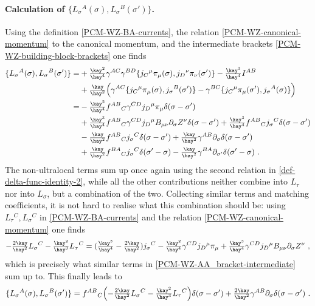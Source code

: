 \documentclass[12pt]{article}
\numberwithin{equation}{section}
\begin{document}
\paragraph{Calculation of $\{L_{\sigma}{}^{A}(\sigma),L_{\sigma}{}^{B}(\sigma')\}$.}  Using the definition \eqref{PCM-WZ-BA-currents}, the relation \eqref{PCM-WZ-canonical-momentum} to the canonical momentum, and the intermediate brackets \eqref{PCM-WZ-building-block-brackets} one finds
\begin{align}\label{PCM-WZ-AA_bracket-intermediate}
\{L_{\sigma}{}^{A}(\sigma),L_{\sigma}{}^{B}(\sigma')\}=&+\tfrac{\kay^2}{\hay^4}\gamma^{AC}\gamma^{BD}\{j_{C}{}^{\mu}\pi_{\mu}(\sigma),j_{D}{}^{\nu}\pi_{\nu}(\sigma')\}-\tfrac{\kay^3}{\hay^4}I^{AB}
\notag \\
&+\tfrac{\kay}{\hay^2}\Bigl( \gamma^{AC}\{j_{C}{}^{\mu}\pi_{\mu}(\sigma),j_{\sigma}{}^{B}(\sigma')\}-\gamma^{BC}\{j_{C}{}^{\mu}\pi_{\mu}(\sigma'),j_{\sigma}{}^{A}(\sigma)\}\Bigr)
\notag \\
=&-\tfrac{\kay^2}{\hay^4}f^{AB}{}_{C}\gamma^{CD}j_{D}{}^{\mu}\pi_{\mu}\delta(\sigma-\sigma')
\notag\\
&+\tfrac{\kay^3}{\hay^4}f^{AB}{}_{C}\gamma^{CD}j_{D}{}^{\mu}B_{\mu\nu}\partial_{\sigma}Z^{\nu}\delta(\sigma-\sigma')+\tfrac{\kay^3}{\hay^4}f^{AB}{}_{C}j_{\sigma}{}^{C}\delta(\sigma-\sigma')
\notag\\
&-\tfrac{\kay}{\hay^2}f^{AB}{}_{C}j_{\sigma}{}^{C}\delta(\sigma-\sigma')+\tfrac{\kay}{\hay^2}\gamma^{AB}\partial_{\sigma}\delta(\sigma-\sigma')
\notag\\
&+\tfrac{\kay}{\hay^2}f^{BA}{}_{C}j_{\sigma}{}^{C}\delta(\sigma'-\sigma)-\tfrac{\kay}{\hay^2}\gamma^{BA}\partial_{\sigma'}\delta(\sigma'-\sigma) \,\, .
\end{align}
The non-ultralocal terms sum up once again using the second relation in \eqref{def-delta-func-identity-2}, while all the other contributions neither combine into $L_{\tau}$ nor into $L_{\sigma}$, but a combination of the two. Collecting similar terms and matching coefficients, it is not hard to realise what this combination should be: using $L_{\tau}{}^{C},L_{\sigma}{}^{C}$ in \eqref{PCM-WZ-BA-currents} and the relation \eqref{PCM-WZ-canonical-momentum} one finds
\begin{equation}
-\tfrac{2\kay}{\hay^2}L_{\sigma}{}^{C}-\tfrac{\kay^2}{\hay^3}L_{\tau}{}^{C}=(\tfrac{\kay^3}{\hay^4}-\tfrac{2\kay}{\hay^2})j_{\sigma}{}^{C}-\tfrac{\kay^2}{\hay^4}\gamma^{CD}j_{D}{}^{\mu}\pi_{\mu}+\tfrac{\kay^3}{\hay^4}\gamma^{CD}j_{D}{}^{\mu}B_{\mu\nu}\partial_{\sigma}Z^{\nu} \,\, ,
\end{equation}
which is precisely what similar terms in \eqref{PCM-WZ-AA_bracket-intermediate} sum up to. This finally leads to
\begin{equation}
\{L_{\sigma}{}^{A}(\sigma),L_{\sigma}{}^{B}(\sigma')\}=f^{AB}{}_{C}\Bigl( -\tfrac{2\kay}{\hay^2}L_{\sigma}{}^{C}-\tfrac{\kay^2}{\hay^3}L_{\tau}{}^{C}\Bigr)\delta(\sigma-\sigma')+\tfrac{2\kay}{\hay^2}\gamma^{AB}\partial_{\sigma}\delta(\sigma-\sigma') \,\, .
\end{equation}








\end{document}
